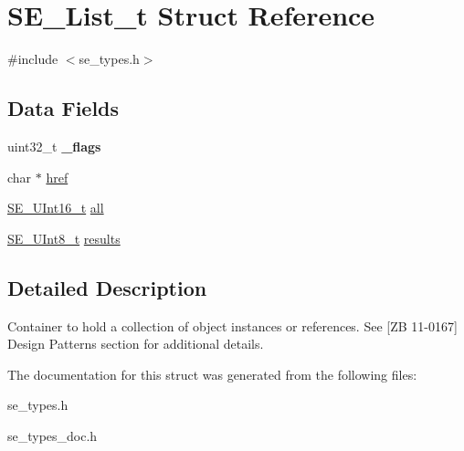 \hypertarget{structSE__List__t}{}\section{S\+E\+\_\+\+List\+\_\+t Struct Reference}
\label{structSE__List__t}


{\ttfamily \#include $<$se\+\_\+types.\+h$>$}

\subsection*{Data Fields}
\begin{DoxyCompactItemize}
\item 
uint32\+\_\+t {\bfseries \+\_\+flags}
\item 
char $\ast$ \hyperlink{group__List_ga292140ab8456be369391e06dec3936e3}{href}
\item 
\hyperlink{group__UInt16_gac68d541f189538bfd30cfaa712d20d29}{S\+E\+\_\+\+U\+Int16\+\_\+t} \hyperlink{group__List_gaa4cc7b617e61b09b6420db908051cd17}{all}
\item 
\hyperlink{group__UInt8_gaf7c365a1acfe204e3a67c16ed44572f5}{S\+E\+\_\+\+U\+Int8\+\_\+t} \hyperlink{group__List_ga7214cada4051d8f8873195463eddbd7e}{results}
\end{DoxyCompactItemize}


\subsection{Detailed Description}
Container to hold a collection of object instances or references. See \mbox{[}ZB 11-\/0167\mbox{]} Design Patterns section for additional details. 

The documentation for this struct was generated from the following files\+:\begin{DoxyCompactItemize}
\item 
se\+\_\+types.\+h\item 
se\+\_\+types\+\_\+doc.\+h\end{DoxyCompactItemize}
